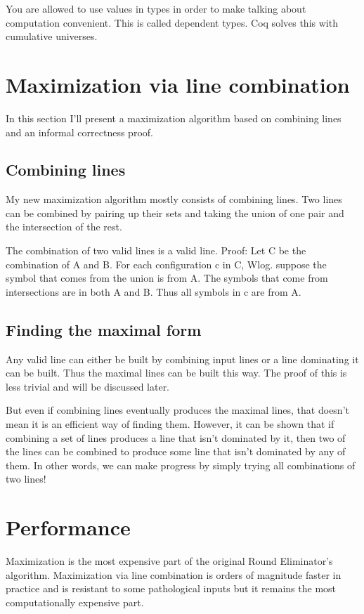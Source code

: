 \documentclass[english, 12pt, a4paper, sci, a-1b, online]{aaltothesis}
\begin{document}
You are allowed to use values in types in order to make talking about computation convenient. This is called dependent types. Coq solves this with cumulative universes.


\section{Maximization via line combination}

In this section I'll present a maximization algorithm based on combining lines and an informal correctness proof.

\subsection{Combining lines}

My new maximization algorithm mostly consists of combining lines. Two lines can be combined by pairing up their sets and taking the union of one pair and the intersection of the rest.

The combination of two valid lines is a valid line. Proof: Let C be the combination of A and B. For each configuration c in C, Wlog. suppose the symbol that comes from the union is from A. The symbols that come from intersections are in both A and B. Thus all symbols in c are from A.

\subsection{Finding the maximal form}

Any valid line can either be built by combining input lines or a line dominating it can be built. Thus the maximal lines can be built this way. The proof of this is less trivial and will be discussed later.

But even if combining lines eventually produces the maximal lines, that doesn't mean it is an efficient way of finding them. However, it can be shown that if combining a set of lines produces a line that isn't dominated by it, then two of the lines can be combined to produce some line that isn't dominated by any of them. In other words, we can make progress by simply trying all combinations of two lines!

\section{Performance}

Maximization is the most expensive part of the original Round Eliminator's algorithm. Maximization via line combination is orders of magnitude faster in practice and is resistant to some pathological inputs but it remains the most computationally expensive part. %
\end{document}
